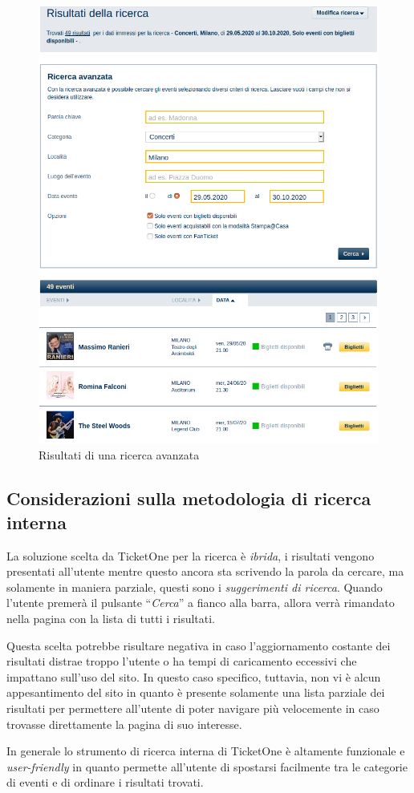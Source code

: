 	\begin{figure}[hbt]
		\centering
		\includegraphics[width=\textwidth-.75cm]{img/ricerca_4.png}
		\caption{Risultati di una ricerca avanzata}
		\label{ricerca4}
	\end{figure}

\subsection{Considerazioni sulla metodologia di ricerca interna}

	\par La soluzione scelta da TicketOne per la ricerca è \textit{ibrida}, i risultati vengono presentati all'utente mentre questo ancora sta scrivendo la parola da cercare, ma solamente in maniera parziale, questi sono i \textit{suggerimenti di ricerca}.
	Quando l'utente premerà il pulsante ``\textit{Cerca}'' a fianco alla barra, allora verrà rimandato nella pagina con la lista di tutti i risultati.
	\par Questa scelta potrebbe risultare negativa in caso l'aggiornamento costante dei risultati distrae troppo l'utente o ha tempi di caricamento eccessivi che impattano sull'uso del sito.
	In questo caso specifico, tuttavia, non vi è alcun appesantimento del sito in quanto è presente solamente una lista parziale dei risultati per permettere all'utente di poter navigare più velocemente in caso trovasse direttamente la pagina di suo interesse.
	\par In generale lo strumento di ricerca interna di TicketOne è altamente funzionale e \textit{user-friendly} in quanto permette all'utente di spostarsi facilmente tra le categorie di eventi e di ordinare i risultati trovati.
